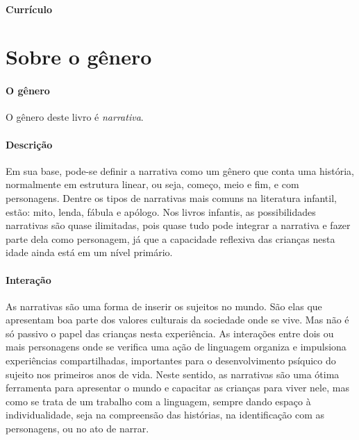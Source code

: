 \documentclass[11pt]{extarticle}
\begin{document}
\paragraph{Currículo} 


\section{Sobre o gênero}

\paragraph{O gênero} O gênero deste livro é \textit{narrativa}. 

\paragraph{Descrição} Em sua base, pode-se definir a narrativa como um gênero que conta uma história, normalmente em estrutura linear, ou seja, começo, meio e fim, e com personagens. 
Dentre os tipos de narrativas mais comuns na literatura infantil, estão: mito, lenda, 
fábula e apólogo. Nos livros infantis, as possibilidades narrativas são quase ilimitadas, pois quase tudo pode integrar a narrativa e fazer parte dela como personagem, já que a capacidade reflexiva das crianças nesta idade ainda está em um nível primário. 



\paragraph{Interação} As narrativas são uma forma de inserir os sujeitos no mundo. 
São elas que apresentam boa parte dos valores culturais da sociedade 
onde se vive. Mas não é só passivo o papel das crianças nesta experiência. 
As interações entre dois ou mais personagens onde se verifica
uma ação de linguagem organiza e impulsiona experiências compartilhadas,
importantes para o desenvolvimento psíquico do sujeito nos primeiros anos de vida.
Neste sentido, as narrativas são uma ótima ferramenta para
apresentar o mundo e capacitar as crianças para viver nele, mas como se
trata de um trabalho com a linguagem, sempre dando espaço à individualidade, 
seja na compreensão das histórias, na identificação com as personagens, ou 
no ato de narrar.

\end{document}
